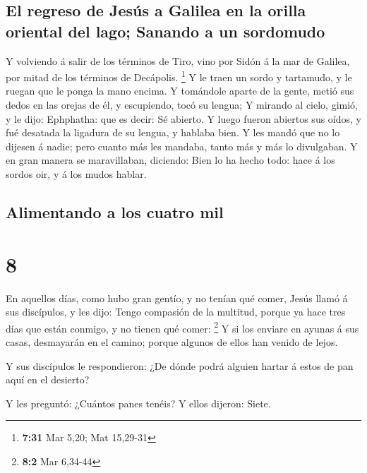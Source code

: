 \hypertarget{el-regreso-de-jesuxfas-a-galilea-en-la-orilla-oriental-del-lago-sanando-a-un-sordomudo}{%
\subsection{El regreso de Jesús a Galilea en la orilla oriental del
lago; Sanando a un
sordomudo}\label{el-regreso-de-jesuxfas-a-galilea-en-la-orilla-oriental-del-lago-sanando-a-un-sordomudo}}

 Y volviendo á salir de los términos de Tiro, vino por
Sidón á la mar de Galilea, por mitad de los términos de Decápolis.
\footnote{\textbf{7:31} Mar 5,20; Mat 15,29-31}  Y le
traen un sordo y tartamudo, y le ruegan que le ponga la mano encima.
 Y tomándole aparte de la gente, metió sus dedos en las
orejas de él, y escupiendo, tocó su lengua;  Y mirando al
cielo, gimió, y le dijo: Ephphatha: que es decir: Sé abierto.
 Y luego fueron abiertos sus oídos, y fué desatada la
ligadura de su lengua, y hablaba bien.  Y les mandó que
no lo dijesen á nadie; pero cuanto más les mandaba, tanto más y más lo
divulgaban.  Y en gran manera se maravillaban, diciendo:
Bien lo ha hecho todo: hace á los sordos oir, y á los mudos hablar.

\hypertarget{alimentando-a-los-cuatro-mil}{%
\subsection{Alimentando a los cuatro
mil}\label{alimentando-a-los-cuatro-mil}}

\hypertarget{section-7}{%
\section{8}\label{section-7}}

 En aquellos días, como hubo gran gentío, y no tenían qué
comer, Jesús llamó á sus discípulos, y les dijo:  Tengo
compasión de la multitud, porque ya hace tres días que están conmigo, y
no tienen qué comer: \footnote{\textbf{8:2} Mar 6,34-44} 
Y si los enviare en ayunas á sus casas, desmayarán en el camino; porque
algunos de ellos han venido de lejos.

 Y sus discípulos le respondieron: ¿De dónde podrá alguien
hartar á estos de pan aquí en el desierto?

 Y les preguntó: ¿Cuántos panes tenéis? Y ellos dijeron:
Siete.

